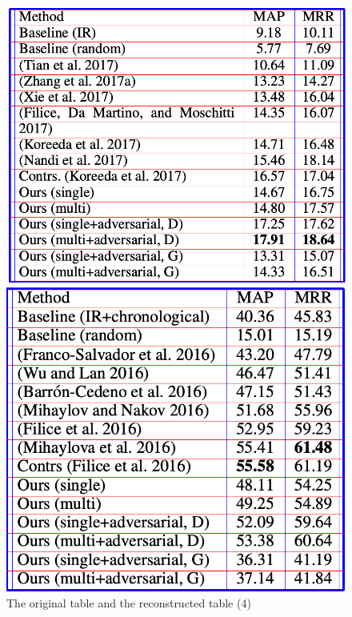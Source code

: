 \documentclass[12pt, a4paper]{article}
\theoremstyle{definition}
\begin{document}
\begin{figure}[htbp]
	\centering
		\begin{minipage}[t]{0.4\linewidth}
		\centering
		\includegraphics[width=\linewidth]{reconstructed_6.png}
		\end{minipage}
		\begin{minipage}[t]{0.4\linewidth}
		\centering
		\includegraphics[width=\linewidth]{reconstructed_7.png}
		\end{minipage}
	\caption{The original table and the reconstructed table (4)}
	\label{fig6.8}
\end{figure}
\end{document}
